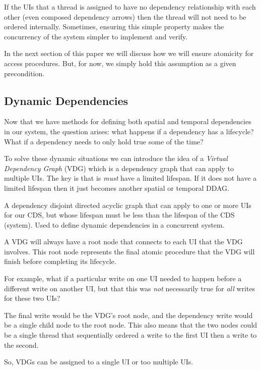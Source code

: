 If the UIs that a thread is assigned to have no dependency relationship with each other (even composed dependency arrows) then the thread will not need to be ordered internally. Sometimes, ensuring this simple property makes the concurrency of the system simpler to implement and verify.

In the next section of this paper we will discuss how we will ensure atomicity for access procedures. But, for now, we simply hold this assumption as a given precondition.

\subsection{Dynamic Dependencies}

Now that we have methods for defining both spatial and temporal dependencies in our system, the question arises: what happens if a dependency has a lifecycle? What if a dependency needs to only hold true some of the time?

To solve these dynamic situations we can introduce the idea of a \textit{Virtual Dependency Graph} (VDG) which is a dependency graph that can apply to multiple UIs. The key is that is \textit{must} have a limited lifespan. If it does not have a limited lifespan then it just becomes another spatial or temporal DDAG.

\begin{con-def}
	\label{virtual-ddag}
	A dependency disjoint directed acyclic graph that can apply to one or more UIs for our CDS, but whose lifespan must be less than the lifespan of the CDS (system). Used to define dynamic dependencies in a concurrent system.
\end{con-def}

A VDG will always have a root node that connects to each UI that the VDG involves. This root node represents the final atomic procedure that the VDG will finish before completing its lifecycle.

For example, what if a particular write on one UI needed to happen before a different write on another UI, but that this was \textit{not} necessarily true for \textit{all} writes for these two UIs?

The final write would be the VDG's root node, and the dependency write would be a single child node to the root node. This also means that the two nodes could be a single thread that sequentially ordered a write to the first UI then a write to the second.

So, VDGs can be assigned to a single UI or too multiple UIs.

